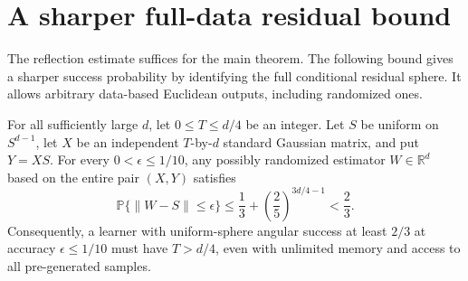 \section{A sharper full-data residual bound}\label{h:end:tail-section}

The reflection estimate suffices for the main theorem. The following
bound gives a sharper success probability by identifying the full
conditional residual sphere. It allows arbitrary data-based Euclidean
outputs, including randomized ones.

\begin{lemma}
\label{h:end:linear}
For all sufficiently large $d$, let $0\le T\le d/4$ be an integer.
Let $S$ be uniform on $S^{d-1}$, let $X$ be an independent
$T$-by-$d$ standard Gaussian matrix, and put $Y=XS$. For every
$0<\epsilon\le1/10$, any possibly randomized estimator $W\in\mathbb R^d$
based on the entire pair $(X,Y)$ satisfies
\begin{equation}\label{h:end:full-data-bound}
 \mathbb P\{\|W-S\|\le\epsilon\}
 \le \frac13+\left(\frac25\right)^{3d/4-1}
 <\frac23.
\end{equation}
Consequently, a learner with uniform-sphere angular success at least
$2/3$ at accuracy $\epsilon\le1/10$ must have $T>d/4$, even with
unlimited memory and access to all pre-generated samples.
\end{lemma}

